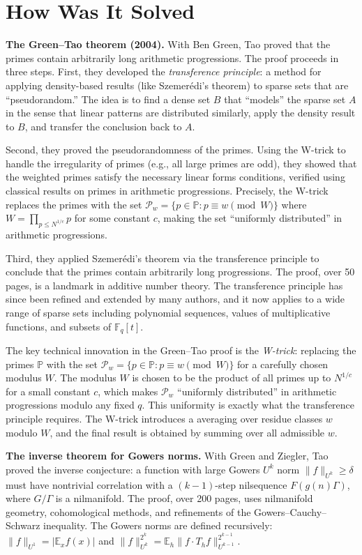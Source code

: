 \section{How Was It Solved}

\textbf{The Green--Tao theorem (2004).} With Ben Green, Tao proved that the primes contain arbitrarily long arithmetic progressions. The proof proceeds in three steps. First, they developed the \emph{transference principle}: a method for applying density-based results (like Szemer\'edi's theorem) to sparse sets that are ``pseudorandom.'' The idea is to find a dense set $B$ that ``models'' the sparse set $A$ in the sense that linear patterns are distributed similarly, apply the density result to $B$, and transfer the conclusion back to $A$.

Second, they proved the pseudorandomness of the primes. Using the W-trick to handle the irregularity of primes (e.g., all large primes are odd), they showed that the weighted primes satisfy the necessary linear forms conditions, verified using classical results on primes in arithmetic progressions. Precisely, the W-trick replaces the primes with the set $\mathcal{P}_w = \{p \in \mathbb{P} : p \equiv w \pmod{W}\}$ where $W = \prod_{p \le N^{1/c}} p$ for some constant $c$, making the set ``uniformly distributed'' in arithmetic progressions.

Third, they applied Szemer\'edi's theorem via the transference principle to conclude that the primes contain arbitrarily long progressions. The proof, over 50 pages, is a landmark in additive number theory. The transference principle has since been refined and extended by many authors, and it now applies to a wide range of sparse sets including polynomial sequences, values of multiplicative functions, and subsets of $\mathbb{F}_q[t]$.

The key technical innovation in the Green--Tao proof is the \emph{W-trick}: replacing the primes $\mathbb{P}$ with the set $\mathcal{P}_w = \{p \in \mathbb{P} : p \equiv w \pmod{W}\}$ for a carefully chosen modulus $W$. The modulus $W$ is chosen to be the product of all primes up to $N^{1/c}$ for a small constant $c$, which makes $\mathcal{P}_w$ ``uniformly distributed'' in arithmetic progressions modulo any fixed $q$. This uniformity is exactly what the transference principle requires. The W-trick introduces a averaging over residue classes $w$ modulo $W$, and the final result is obtained by summing over all admissible $w$.

\textbf{The inverse theorem for Gowers norms.} With Green and Ziegler, Tao proved the inverse conjecture: a function with large Gowers $U^k$ norm $\|f\|_{U^k} \ge \delta$ must have nontrivial correlation with a $(k-1)$-step nilsequence $F(g(n)\Gamma)$, where $G/\Gamma$ is a nilmanifold. The proof, over 200 pages, uses nilmanifold geometry, cohomological methods, and refinements of the Gowers--Cauchy--Schwarz inequality. The Gowers norms are defined recursively: $\|f\|_{U^1} = |\mathbb{E}_x f(x)|$ and $\|f\|_{U^k}^{2^k} = \mathbb{E}_h \|f \cdot T_h f\|_{U^{k-1}}^{2^{k-1}}$.

